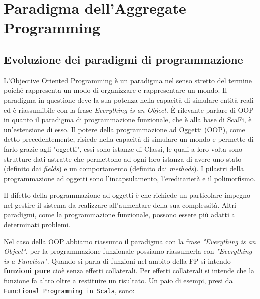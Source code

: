 \documentclass[12pt,a4paper,openright,twoside]{book}
\begin{document}



\section{Paradigma dell'Aggregate Programming}

\subsection{Evoluzione dei paradigmi di programmazione}

L'Objective Oriented Programming è un paradigma nel senso stretto del termine poiché rappresenta un modo di organizzare e rappresentare un mondo. 
Il paradigma in questione deve la sua potenza nella capacità di simulare entità reali ed è riassumibile con la frase \textit{Everything is an Object}. 
È rilevante parlare di OOP in quanto il paradigma di programmazione funzionale, che è alla base di ScaFi, è un'estensione di esso. 
Il potere della programmazione ad Oggetti (OOP), come detto precedentemente, risiede nella capacità di simulare un mondo e permette di farlo grazie agli "oggetti", essi sono istanze di Classi, le quali a loro volta sono strutture dati astratte che permettono ad ogni loro istanza di avere uno stato (definito dai \textit{fields}) e un comportamento (definito dai \textit{methods}).
I pilastri della programmazione ad oggetti sono l'incapsulamento, l'ereditarietà e il polimorfismo.

Il difetto della programmazione ad oggetti è che richiede un particolare impegno nel gestire il sistema da realizzare all'aumentare della sua complessità. Altri paradigmi, come la programmazione funzionale, possono essere più adatti a determinati problemi.

Nel caso della OOP abbiamo riassunto il paradigma con la frase \textit{"Everything is an Object"}, per la programmazione funzionale possiamo riassumerla con \textit{"Everything is a Function"}. Quando si parla di funzioni nel ambito della \ac{FP} si intendo \textbf{funzioni pure} cioè senza effetti collaterali. Per effetti collaterali si intende che la funzione fa altro oltre a restituire un risultato. Un paio di esempi, presi da \texttt{Functional Programming in Scala}, sono:
\end{document}
